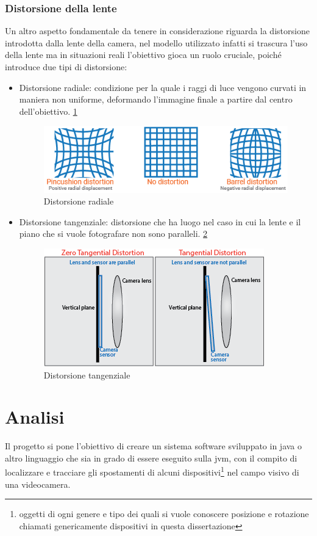 \documentclass[12pt,a4paper,openright,twoside]{book}
\begin{document}
\subsection{Distorsione della lente}
Un altro aspetto fondamentale da tenere in considerazione riguarda la distorsione introdotta dalla lente della camera, nel modello utilizzato infatti si trascura l'uso della lente ma in situazioni reali l'obiettivo gioca un ruolo cruciale, poiché introduce due tipi di distorsione:
\begin{itemize}
	\item Distorsione radiale: condizione per la quale i raggi di luce vengono curvati in maniera non uniforme, deformando l'immagine finale a partire dal centro dell'obiettivo. \ref{fig:radial_distortion}
	\begin{figure}[h!]
		\centering
		\includegraphics[width=0.5\linewidth]{./figures/radial_distortion.png}
		\caption{Distorsione radiale}
		\label{fig:radial_distortion}
	\end{figure}
	\item  Distorsione tangenziale: distorsione che ha luogo nel caso in cui la lente e il piano che si vuole fotografare non sono paralleli. \ref{fig:tangential_distortion}
	\begin{figure}[h!]
		\centering
		\includegraphics[width=0.5\linewidth]{./figures/tangential_distortion.png}
		\caption{Distorsione tangenziale}
		\label{fig:tangential_distortion}
	\end{figure}
\end{itemize} 

\chapter{Analisi}
Il progetto si pone l'obiettivo di creare un sistema software sviluppato in java o altro linguaggio che sia in grado di essere eseguito sulla \acrfull{jvm}, con il compito di localizzare e tracciare gli spostamenti di alcuni dispositivi\footnote{oggetti di ogni genere e tipo dei quali si vuole conoscere posizione e rotazione chiamati genericamente dispositivi in questa dissertazione} nel campo visivo di una videocamera.
\end{document}
